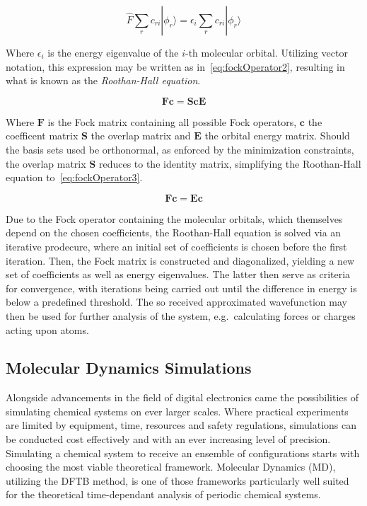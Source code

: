 \documentclass[12pt]{article}
\begin{document}
\begin{equation}
  \hat{F}\sum_{r}^{}c_{r i}|\phi_{r}\rangle = \epsilon_i\sum_{r}^{}c_{r i}|\phi_{r}\rangle
  \label{eq:fockOperator}
\end{equation}

\bigskip

\noindent Where $\epsilon_i$ is the energy eigenvalue of the $i$-th molecular orbital. Utilizing vector notation, this expression may be written as in~\ref{eq:fockOperator2}, resulting in what is known as the \textit{Roothan-Hall equation}.


\begin{equation}
  \mathbf{Fc} = \mathbf{Sc}\mathbf{E}
  \label{eq:fockOperator2}
\end{equation}

\noindent Where $\mathbf{F}$ is the Fock matrix containing all possible Fock operators, $\mathbf{c}$ the coefficent matrix $\mathbf{S}$ the overlap matrix and $\mathbf{E}$ the orbital energy matrix.
Should the basis sets used be orthonormal, as enforced by the minimization constraints, the overlap matrix $\mathbf{S}$ reduces to the identity matrix, simplifying the Roothan-Hall equation to~\ref{eq:fockOperator3}.

\begin{equation}
  \mathbf{Fc} = \mathbf{Ec}
  \label{eq:fockOperator3}
\end{equation}

\bigskip

\noindent Due to the Fock operator containing the molecular orbitals, which themselves depend on the chosen coefficients, the Roothan-Hall equation is solved via an iterative prodecure, where an initial set of coefficients is chosen before the first iteration.
Then, the Fock matrix is constructed and diagonalized, yielding a new set of coefficients as well as energy eigenvalues.
The latter then serve as criteria for convergence, with iterations being carried out until the difference in energy is below a predefined threshold.
The so received approximated wavefunction may then be used for further analysis of the system, e.g.~calculating forces or charges acting upon atoms.


\subsection{Molecular Dynamics Simulations}
Alongside advancements in the field of digital electronics came the possibilities of simulating chemical 
systems on ever larger scales. Where practical experiments are limited by equipment, time, resources and safety regulations, 
simulations can be conducted cost effectively and with an ever increasing level of precision.
Simulating a chemical system to receive an ensemble of configurations starts with choosing the most viable
theoretical framework. Molecular Dynamics (MD), utilizing the DFTB method, is one of those frameworks particularly well suited for  
the theoretical time-dependant analysis of periodic chemical systems. 


\end{document}
